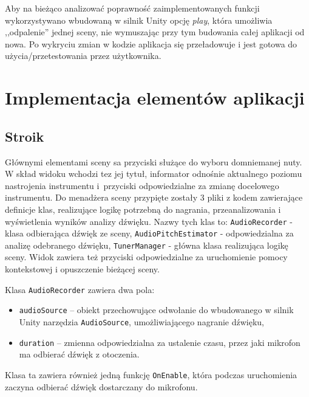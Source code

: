 Aby na bieżąco analizować poprawność zaimplementowanych funkcji wykorzystywano wbudowaną w silnik Unity opcję \emph{play}, która umożliwia ,,odpalenie'' jednej sceny, nie wymuszając przy tym budowania całej aplikacji od nowa. Po wykryciu zmian w kodzie aplikacja się przeładowuje i jest gotowa do użycia/przetestowania przez użytkownika.

\section{Implementacja elementów aplikacji}

\subsection{Stroik}

Głównymi elementami sceny sa przyciski służące do wyboru domniemanej nuty. W skład widoku wchodzi tez jej tytuł, informator odnośnie aktualnego poziomu nastrojenia instrumentu i~przyciski odpowiedzialne za zmianę docelowego instrumentu. Do menadżera sceny przypięte zostały 3 pliki z kodem zawierające definicje klas, realizujące logikę potrzebną do nagrania, przeanalizowania i wyświetlenia wyników analizy dźwięku. Nazwy tych klas to: \texttt{AudioRecorder} - klasa odbierająca dźwięk ze sceny, \texttt{AudioPitchEstimator} - odpowiedzialna za analizę odebranego dźwięku, \texttt{TunerManager} - główna klasa realizująca logikę sceny. Widok zawiera też przyciski odpowiedzialne za uruchomienie pomocy kontekstowej i opuszczenie bieżącej sceny.

Klasa \texttt{AudioRecorder} zawiera dwa pola:
\begin{itemize}
    \item \texttt{audioSource} -- obiekt przechowujące odwołanie do wbudowanego w silnik Unity narzędzia \texttt{AudioSource}, umożliwiającego nagranie dźwięku,
    \item \texttt{duration} -- zmienna odpowiedzialna za ustalenie czasu, przez jaki mikrofon ma odbierać dźwięk z otoczenia.
\end{itemize}
Klasa ta zawiera również jedną funkcję \texttt{OnEnable}, która podczas uruchomienia zaczyna odbierać dźwięk dostarczany do mikrofonu. 

